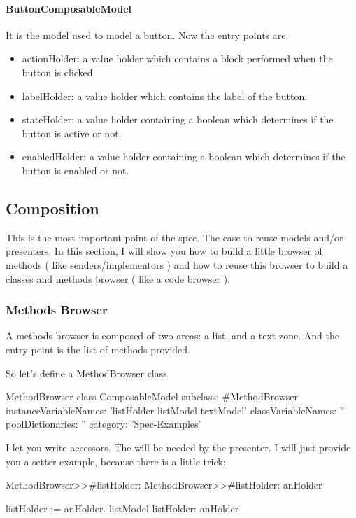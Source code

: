 \documentclass[a4paper,10pt,twoside]{book}
\begin{document}
\paragraph{ButtonComposableModel} It is the model used to model a button.
Now the entry points are:
\begin{itemize}
	\item actionHolder: a value holder which contains a block performed when the button is clicked.
	\item labelHolder: a value holder which contains the label of the button.
	\item stateHolder: a value holder containing a boolean which determines if the button is active or not.
	\item enabledHolder: a value holder containing a boolean which determines if the button is enabled or not.
	\end{itemize}

\subsection{Composition}

This is the most important point of the spec. The ease to reuse models and/or presenters.
In this section, I will show you how to build a little browser of methods ( like senders/implementors ) and how to reuse this browser to build a classes and methods browser ( like a code browser ).

\subsubsection{Methods Browser}

A methods browser is composed of two areas: a list, and a text zone. And the entry point is the list of methods provided.

So let's define a MethodBrowser class

\begin{classdef}{MethodBrowser class}
ComposableModel subclass: #MethodBrowser
	instanceVariableNames: 'listHolder listModel textModel'
	classVariableNames: ''
	poolDictionaries: ''
	category: 'Spec-Examples'
\end{classdef}

I let you write accessors. The will be needed by the presenter.
I will just provide you a setter example, because there is a little trick:

\begin{method}{MethodBrowser>>\#listHolder:}
MethodBrowser>>#listHolder: anHolder
	
	listHolder := anHolder.
	listModel listHolder: anHolder
\end{method}
\end{document}
